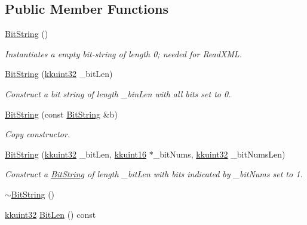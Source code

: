\subsection*{Public Member Functions}
\begin{DoxyCompactItemize}
\item 
\hyperlink{class_k_k_b_1_1_bit_string_a129b293aa7369637810c1d54471e1258}{Bit\+String} ()
\begin{DoxyCompactList}\small\item\em Instantiates a empty bit-\/string of length 0; needed for Read\+X\+ML. \end{DoxyCompactList}\item 
\hyperlink{class_k_k_b_1_1_bit_string_ab5d7f4ff230b20e46451bf7322ef31b8}{Bit\+String} (\hyperlink{namespace_k_k_b_af8d832f05c54994a1cce25bd5743e19a}{kkuint32} \+\_\+bit\+Len)
\begin{DoxyCompactList}\small\item\em Construct a bit string of length \+\_\+bin\+Len with all bits set to \textquotesingle{}0\textquotesingle{}. \end{DoxyCompactList}\item 
\hyperlink{class_k_k_b_1_1_bit_string_aaae20c7515dc5ddd98e4ffa65a3a379a}{Bit\+String} (const \hyperlink{class_k_k_b_1_1_bit_string}{Bit\+String} \&b)
\begin{DoxyCompactList}\small\item\em Copy constructor. \end{DoxyCompactList}\item 
\hyperlink{class_k_k_b_1_1_bit_string_a934828473e02585ddc44ff46ee0ea637}{Bit\+String} (\hyperlink{namespace_k_k_b_af8d832f05c54994a1cce25bd5743e19a}{kkuint32} \+\_\+bit\+Len, \hyperlink{namespace_k_k_b_aa8c7d4d30381c8a0b6fce68974a9c8a9}{kkuint16} $\ast$\+\_\+bit\+Nums, \hyperlink{namespace_k_k_b_af8d832f05c54994a1cce25bd5743e19a}{kkuint32} \+\_\+bit\+Nums\+Len)
\begin{DoxyCompactList}\small\item\em Construct a \hyperlink{class_k_k_b_1_1_bit_string}{Bit\+String} of length \+\_\+bit\+Len with bits indicated by \textquotesingle{}\+\_\+bit\+Nums\textquotesingle{} set to \textquotesingle{}1\textquotesingle{}. \end{DoxyCompactList}\item 
\hyperlink{class_k_k_b_1_1_bit_string_a80cc99cfa92f334852ff43f44ff36f4f}{$\sim$\+Bit\+String} ()
\item 
\hyperlink{namespace_k_k_b_af8d832f05c54994a1cce25bd5743e19a}{kkuint32} \hyperlink{class_k_k_b_1_1_bit_string_a989985f5b1d32ae42722f19852894605}{Bit\+Len} () const 

\end{DoxyCompactItemize}
